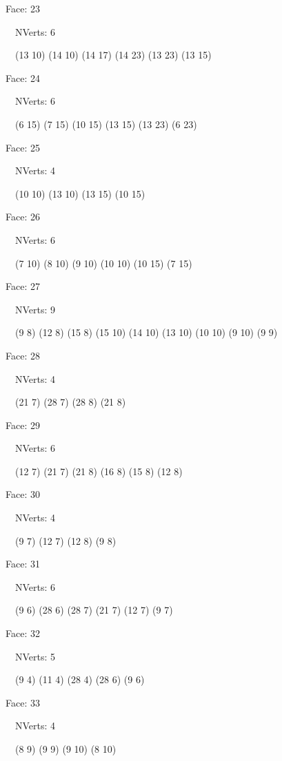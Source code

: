 \documentclass{article}
\begin{document}
{\footnotesize 

Face: 23

\   \    NVerts: 6

 \   \   (13 10) (14 10) (14 17) (14 23) (13 23) (13 15)}

{\footnotesize 

Face: 24

\   \    NVerts: 6

 \   \   (6 15) (7 15) (10 15) (13 15) (13 23) (6 23)}

{\footnotesize 

Face: 25

\   \    NVerts: 4

 \   \   (10 10) (13 10) (13 15) (10 15)}

{\footnotesize 

Face: 26

\   \    NVerts: 6

 \   \   (7 10) (8 10) (9 10) (10 10) (10 15) (7 15)}

{\footnotesize 

Face: 27

\   \    NVerts: 9

 \   \   (9 8) (12 8) (15 8) (15 10) (14 10) (13 10) (10 10) (9 10) (9 9)}

{\footnotesize 

Face: 28

\   \    NVerts: 4

 \   \   (21 7) (28 7) (28 8) (21 8)}

{\footnotesize 

Face: 29

\   \    NVerts: 6

 \   \   (12 7) (21 7) (21 8) (16 8) (15 8) (12 8)}

{\footnotesize 

Face: 30

\   \    NVerts: 4

 \   \   (9 7) (12 7) (12 8) (9 8)}

{\footnotesize 

Face: 31

\   \    NVerts: 6

 \   \   (9 6) (28 6) (28 7) (21 7) (12 7) (9 7)}

{\footnotesize 

Face: 32

\   \    NVerts: 5

 \   \   (9 4) (11 4) (28 4) (28 6) (9 6)}

{\footnotesize 

Face: 33

\   \    NVerts: 4

 \   \   (8 9) (9 9) (9 10) (8 10)}
\end{document}
